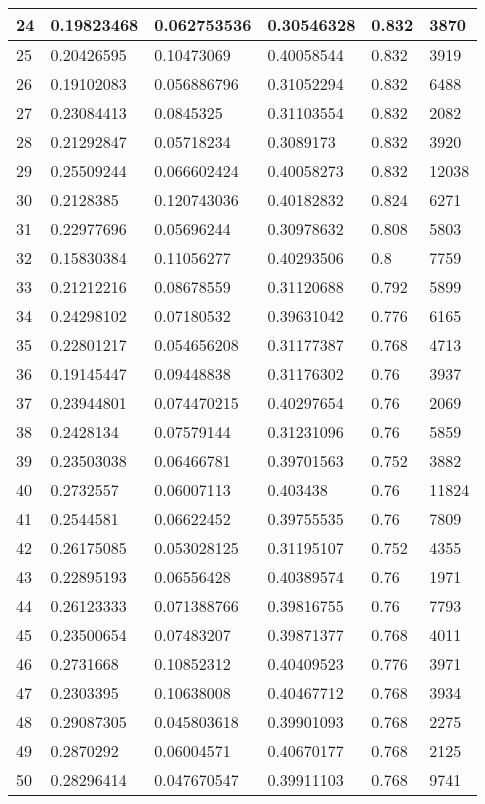 \begin{longtable}{|l|l|l|l|l|l|}
24 & 0.19823468 & 0.062753536 & 0.30546328 & 0.832 & 3870 \\ \hline 
25 & 0.20426595 & 0.10473069 & 0.40058544 & 0.832 & 3919 \\ \hline 
26 & 0.19102083 & 0.056886796 & 0.31052294 & 0.832 & 6488 \\ \hline 
27 & 0.23084413 & 0.0845325 & 0.31103554 & 0.832 & 2082 \\ \hline 
28 & 0.21292847 & 0.05718234 & 0.3089173 & 0.832 & 3920 \\ \hline 
29 & 0.25509244 & 0.066602424 & 0.40058273 & 0.832 & 12038 \\ \hline 
30 & 0.2128385 & 0.120743036 & 0.40182832 & 0.824 & 6271 \\ \hline 
31 & 0.22977696 & 0.05696244 & 0.30978632 & 0.808 & 5803 \\ \hline 
32 & 0.15830384 & 0.11056277 & 0.40293506 & 0.8 & 7759 \\ \hline 
33 & 0.21212216 & 0.08678559 & 0.31120688 & 0.792 & 5899 \\ \hline 
34 & 0.24298102 & 0.07180532 & 0.39631042 & 0.776 & 6165 \\ \hline 
35 & 0.22801217 & 0.054656208 & 0.31177387 & 0.768 & 4713 \\ \hline 
36 & 0.19145447 & 0.09448838 & 0.31176302 & 0.76 & 3937 \\ \hline 
37 & 0.23944801 & 0.074470215 & 0.40297654 & 0.76 & 2069 \\ \hline 
38 & 0.2428134 & 0.07579144 & 0.31231096 & 0.76 & 5859 \\ \hline 
39 & 0.23503038 & 0.06466781 & 0.39701563 & 0.752 & 3882 \\ \hline 
40 & 0.2732557 & 0.06007113 & 0.403438 & 0.76 & 11824 \\ \hline 
41 & 0.2544581 & 0.06622452 & 0.39755535 & 0.76 & 7809 \\ \hline 
42 & 0.26175085 & 0.053028125 & 0.31195107 & 0.752 & 4355 \\ \hline 
43 & 0.22895193 & 0.06556428 & 0.40389574 & 0.76 & 1971 \\ \hline 
44 & 0.26123333 & 0.071388766 & 0.39816755 & 0.76 & 7793 \\ \hline 
45 & 0.23500654 & 0.07483207 & 0.39871377 & 0.768 & 4011 \\ \hline 
46 & 0.2731668 & 0.10852312 & 0.40409523 & 0.776 & 3971 \\ \hline 
47 & 0.2303395 & 0.10638008 & 0.40467712 & 0.768 & 3934 \\ \hline 
48 & 0.29087305 & 0.045803618 & 0.39901093 & 0.768 & 2275 \\ \hline 
49 & 0.2870292 & 0.06004571 & 0.40670177 & 0.768 & 2125 \\ \hline 
50 & 0.28296414 & 0.047670547 & 0.39911103 & 0.768 & 9741 \\ \hline 
\end{longtable}